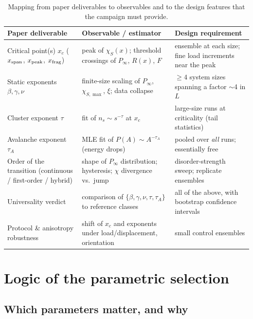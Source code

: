 \documentclass[11pt]{article}
\newcommand{\Pinf}{P_\infty}
\newcommand{\xc}{x_c}
\begin{document}
\begin{table}[h]
\centering
\small
\renewcommand{\arraystretch}{1.25}
\begin{tabular}{p{4.6cm} p{4.8cm} p{4.6cm}}
\toprule
\textbf{Paper deliverable} & \textbf{Observable / estimator} & \textbf{Design requirement}\\
\midrule
Critical point(s) $\xc$ ($x_{\rm span}$, $x_{\rm peak}$, $x_{\rm frag}$)
 & peak of $\chi_S(x)$; threshold crossings of $\Pinf$, $R(x)$, $F$
 & ensemble at each size; fine load increments near the peak \\
Static exponents $\beta,\gamma,\nu$
 & finite-size scaling of $\Pinf$, $\chi_{S,\max}$, $\xi$; data collapse
 & $\ge 4$ system sizes spanning a factor $\sim$4 in $L$ \\
Cluster exponent $\tau$
 & fit of $n_s\sim s^{-\tau}$ at $\xc$
 & large-size runs at criticality (tail statistics) \\
Avalanche exponent $\tau_A$
 & MLE fit of $P(A)\sim A^{-\tau_A}$ (energy drops)
 & pooled over \emph{all} runs; essentially free \\
Order of the transition (continuous / first-order / hybrid)
 & shape of $\Pinf$ distribution; hysteresis; $\chi$ divergence vs.\ jump
 & disorder-strength sweep; replicate ensembles \\
Universality verdict
 & comparison of $\{\beta,\gamma,\nu,\tau,\tau_A\}$ to reference classes
 & all of the above, with bootstrap confidence intervals \\
Protocol \& anisotropy robustness
 & shift of $\xc$ and exponents under load/displacement, orientation
 & small control ensembles \\
\bottomrule
\end{tabular}
\caption{Mapping from paper deliverables to observables and to the design features
that the campaign must provide.}
\label{tab:targets}
\end{table}

\section{Logic of the parametric selection}
\label{sec:logic}

\subsection{Which parameters matter, and why}
\end{document}

